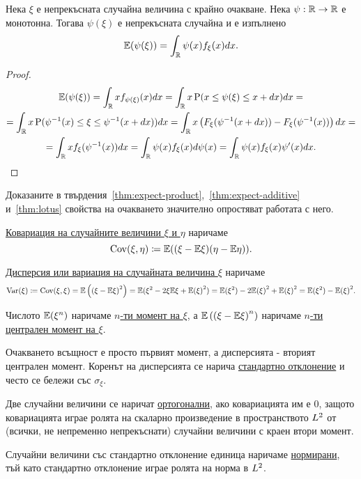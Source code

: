 \documentclass[numbers=endperiod, DIV=15, bibliography=totocnumbered]{scrartcl}
\begin{document}
\begin{proposition}\label{thm:lotus}
  Нека $\xi$ е непрекъсната случайна величина с крайно очакване. Нека $\psi: \mathbb{R} \to \mathbb{R}$ е монотонна. Тогава $\psi(\xi)$ е непрекъсната случайна и е изпълнено
  \begin{displaymath}
    \mathbb{E}(\psi(\xi))
    =
    \int_{\mathbb{R}} \psi(x) f_\xi(x) dx.
  \end{displaymath}
\end{proposition}

\begin{proof}
  \begin{multline*}
    \mathbb{E}(\psi(\xi))
    =
    \int_{\mathbb{R}} x f_{\psi(\xi)}(x) dx
    =
    \int_{\mathbb{R}} x \operatorname{P}(x \leq \psi(\xi) \leq x + dx) dx
    = \\ =
    \int_{\mathbb{R}} x \operatorname{P}(\psi^{-1}(x) \leq \xi \leq \psi^{-1}(x + dx)) dx
    =
    \int_{\mathbb{R}} x \left( F_\xi(\psi^{-1}(x + dx)) - F_\xi(\psi^{-1}(x)) \right) dx
    = \\ =
    \int_{\mathbb{R}} x f_\xi(\psi^{-1}(x)) dx
    =
    \int_{\mathbb{R}} \psi(x) f_\xi(x) d \psi(x)
    =
    \int_{\mathbb{R}} \psi(x) f_\xi(x) \psi'(x) dx.
  \end{multline*}
\end{proof}

Доказаните в твърдения~\ref{thm:expect-product},~\ref{thm:expect-additive} и~\ref{thm:lotus} свойства на очакването значително опростяват работата с него.

\begin{definition}
  \uline{Ковариация на случайните величини $\xi$ и $\eta$} наричаме
  \begin{displaymath}
    \operatorname{Cov}(\xi, \eta)
    \coloneqq
    \mathbb{E}((\xi - \mathbb{E} \xi) (\eta - \mathbb{E} \eta)).
  \end{displaymath}

  \uline{Дисперсия или вариация на случайната величина $\xi$} наричаме
  \begin{displaymath}
    \operatorname{Var}(\xi)
    \coloneqq
    \operatorname{Cov}(\xi, \xi)
    =
    \mathbb{E} \left({(\xi - \mathbb{E} \xi)}^2 \right)
    =
    \mathbb{E}(\xi^2 - 2 \xi \mathbb{E} \xi + {\mathbb{E}(\xi)}^2)
    =
    \mathbb{E}(\xi^2) - 2 {\mathbb{E}(\xi)}^2 + {\mathbb{E}(\xi)}^2
    =
    \mathbb{E}(\xi^2) - {\mathbb{E}(\xi)}^2.
  \end{displaymath}

  Числото $\mathbb{E}(\xi^n)$ наричаме \uline{$n$-ти момент на $\xi$}, а $\mathbb{E} \left( {(\xi - \mathbb{E} \xi)}^n \right)$ наричаме \uline{$n$-ти централен момент на $\xi$}.

  Очакването всъщност е просто първият момент, а дисперсията - вторият централен момент. Коренът на дисперсията се нарича \uline{стандартно отклонение} и често се бележи със $\sigma_\xi$.

  Две случайни величини се наричат \uline{ортогонални}, ако ковариацията им е $0$, защото ковариацията играе ролята на скаларно произведение в пространството $L^2$ от (всички, не непременно непрекъснати) случайни величини с краен втори момент.

  Случайни величини със стандартно отклонение единица наричаме \uline{нормирани}, тъй като стандартно отклонение играе ролята на норма в $L^2$.
\end{definition}
\end{document}
